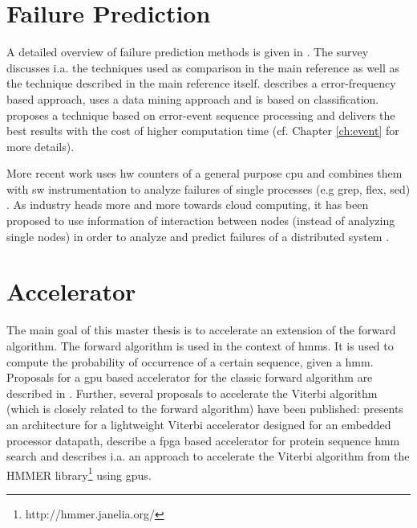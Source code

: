 \documentclass[mscthesis]{usiinfthesis}
\begin{document}
\section{Failure Prediction}
\label{ch:art_pred}
A detailed overview of failure prediction methods is given in
\cite{ACM10_Salfner}. The survey discusses i.a. the techniques used as
comparison in the main reference
\cite{lin88,IEEE90_lin,ICDM02_Vilalta,domeniconi02} as well as the technique
described in the main reference \cite{salfner08} itself. \cite{lin88} describes
a error-frequency based approach, \cite{ICDM02_Vilalta} uses a data mining
approach and \cite{domeniconi02} is based on classification. \cite{salfner08}
proposes a technique based on error-event sequence processing and delivers
the best results with the cost of higher computation time (cf. Chapter
\ref{ch:event} for more details).

More recent work uses \gls{hw} counters of a general purpose \gls{cpu} and
combines them with \gls{sw} instrumentation to analyze failures of single
processes (e.g grep, flex, sed) \cite{FSE10_Yilmaz}. As industry heads more and
more towards cloud computing, it has been proposed to use information of
interaction between nodes (instead of analyzing single nodes) in order to
analyze and predict failures of a distributed system
\cite{IEEE12_Salfner,DSN10_Oliner}.

\section{Accelerator}
\label{ch:art_acc}

The main goal of this master thesis is to accelerate an extension of the
forward algorithm. The forward algorithm is used in the context of \glspl{hmm}.
It is used to compute the probability of occurrence of a certain sequence,
given a \gls{hmm}. Proposals for a \gls{gpu} based accelerator for the classic
forward algorithm are described in \cite{neumann11,liu09}. Further, several
proposals to accelerate the Viterbi algorithm (which is closely related to the
forward algorithm) have been published: \cite{ASAP12_Azhar} presents an
architecture for a lightweight Viterbi accelerator designed for an embedded
processor datapath, \cite{IPDPS07_Jacob,ICS06_Maddimsetty,IPDPS07_Oliver}
describe a \gls{fpga} based accelerator for protein sequence \gls{hmm} search
and \cite{IPDPS09_Walters} describes i.a. an approach to accelerate the Viterbi
algorithm from the HMMER library\footnote{http://hmmer.janelia.org/} using
\glspl{gpu}.
\end{document}
